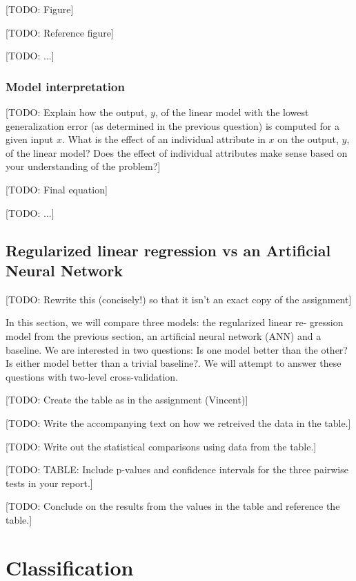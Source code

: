 \documentclass[dtu]{dtuarticle}
\newcommand{\todo}[1]{\color{red}[TODO: #1]\color{black}}
\begin{document}
	\todo{Figure}

	\todo{Reference figure}

	\todo{...}

	\subsubsection{Model interpretation}

	\todo{Explain how the output, $y$, of the linear model with the lowest generalization error (as
		determined in the previous question) is computed for a given input $x$. What is the effect
		of an individual attribute in $x$ on the output, $y$, of the linear model? Does the effect of
		individual attributes make sense based on your understanding of the problem?}

	\todo{Final equation}

	\todo{...}

	\subsection{Regularized linear regression vs an Artificial Neural Network}

	\todo{Rewrite this (concisely!) so that it isn't an exact copy of the assignment}

	In this section, we will compare three models: the regularized linear re-
	gression model from the previous section, an artificial neural network (ANN) and a baseline. We
	are interested in two questions: Is one model better than the other? Is either model better than
	a trivial baseline?. We will attempt to answer these questions with two-level cross-validation.

	\todo{Create the table as in the assignment (Vincent)}

	\todo{Write the accompanying text on how we retreived the data in the table.}

	\todo{Write out the statistical comparisons using data from the table.}

	\todo{TABLE: Include p-values and confidence intervals for the three pairwise tests in your report.}

	\todo{Conclude on the results from the values in the table and reference the table.}


	\section{Classification}
\end{document}
